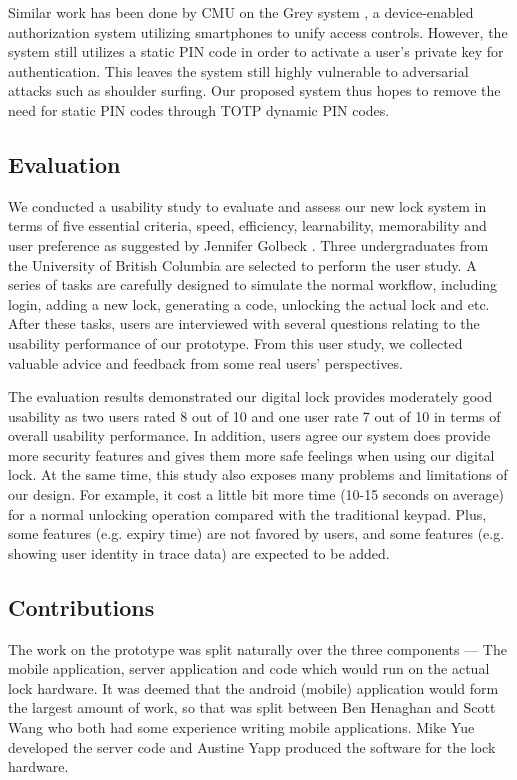 \documentclass[conference]{IEEEtran}
\begin{document}
	Similar work has been done by CMU on the Grey system \cite{ab3}, a device-enabled authorization system utilizing smartphones to unify access controls. However, the system still utilizes a static PIN code in order to activate a user’s private key for authentication. This leaves the system still highly vulnerable to adversarial attacks such as shoulder surfing. Our proposed system thus hopes to remove the need for static PIN codes through TOTP dynamic PIN codes. 

\subsection{Evaluation}
We conducted a usability study to evaluate and assess our new lock system in terms of five essential criteria, speed, efficiency, learnability, memorability and user preference as suggested by Jennifer Golbeck \cite{JG}. Three undergraduates from the University of British Columbia are selected to perform the user study. A series of tasks are carefully designed to simulate the normal workflow, including login, adding a new lock, generating a code, unlocking the actual lock and etc. After these tasks, users are interviewed with several questions relating to the usability performance of our prototype. From this user study, we collected valuable advice and feedback from some real users’ perspectives.

The evaluation results demonstrated our digital lock provides moderately good usability as two users rated 8 out of 10 and one user rate 7 out of 10 in terms of overall usability performance. In addition, users agree our system does provide more security features and gives them more safe feelings when using our digital lock. At the same time, this study also exposes many problems and limitations of our design. For example, it cost a little bit more time (10-15 seconds on average) for a normal unlocking operation compared with the traditional keypad. Plus, some features (e.g. expiry time) are not favored by users, and some features (e.g. showing user identity in trace data) are expected to be added.

\subsection{Contributions}
The work on the prototype was split naturally over the three components --- The mobile application, server application and code which would run on the actual lock hardware.
It was deemed that the android (mobile) application would form the largest amount of work, so that was split between Ben Henaghan and Scott Wang who both had some experience writing mobile applications.
Mike Yue developed the server code and Austine Yapp produced the software for the lock hardware.
\end{document}
